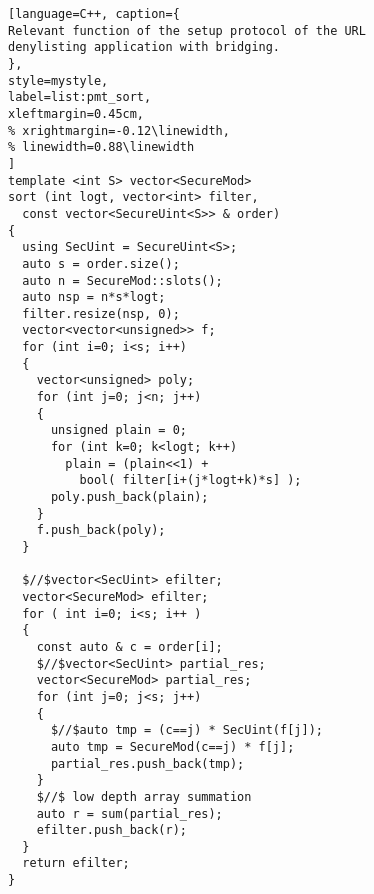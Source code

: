 \begin{figure}[h!]
\begin{minipage}{\linewidth}
\begin{lstlisting}[language=C++, caption={
Relevant function of the setup protocol of the URL denylisting application with bridging.
},
style=mystyle, 
label=list:pmt_sort,
xleftmargin=0.45cm,
% xrightmargin=-0.12\linewidth,
% linewidth=0.88\linewidth
]
template <int S> vector<SecureMod>
sort (int logt, vector<int> filter,
  const vector<SecureUint<S>> & order)
{
  using SecUint = SecureUint<S>;
  auto s = order.size();
  auto n = SecureMod::slots();
  auto nsp = n*s*logt;
  filter.resize(nsp, 0);
  vector<vector<unsigned>> f;
  for (int i=0; i<s; i++)
  {
    vector<unsigned> poly;
    for (int j=0; j<n; j++)
    {
      unsigned plain = 0;
      for (int k=0; k<logt; k++)
        plain = (plain<<1) +
          bool( filter[i+(j*logt+k)*s] );
      poly.push_back(plain);
    }
    f.push_back(poly);
  }
  
  $//$vector<SecUint> efilter;
  vector<SecureMod> efilter;
  for ( int i=0; i<s; i++ )
  {
    const auto & c = order[i];
    $//$vector<SecUint> partial_res;
    vector<SecureMod> partial_res;
    for (int j=0; j<s; j++)
    {
      $//$auto tmp = (c==j) * SecUint(f[j]);
      auto tmp = SecureMod(c==j) * f[j];
      partial_res.push_back(tmp);
    }
    $//$ low depth array summation  
    auto r = sum(partial_res);
    efilter.push_back(r);
  }
  return efilter;
}
\end{lstlisting}
\end{minipage}
\vspace{-0.6 cm}
\end{figure}